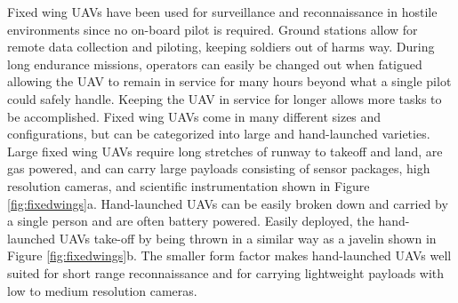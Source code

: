 \documentclass[numbered,pdftex]{ohio-etd}
\begin{document}
Fixed wing UAVs have been used for surveillance and reconnaissance in hostile environments since no on-board pilot is required. Ground stations allow for remote data collection and piloting, keeping soldiers out of harms way. During long endurance missions, operators can easily be changed out when fatigued allowing the UAV to remain in service for many hours beyond what a single pilot could safely handle. Keeping the UAV in service for longer allows more tasks to be accomplished. Fixed wing UAVs come in many different sizes and configurations, but can be categorized into large and hand-launched varieties. Large fixed wing UAVs require long stretches of runway to takeoff and land, are gas powered, and can carry large payloads consisting of sensor packages, high resolution cameras, and scientific instrumentation shown in Figure \ref{fig:fixedwings}a. Hand-launched UAVs can be easily broken down and carried by a single person and are often battery powered. Easily deployed, the hand-launched UAVs take-off by being thrown in a similar way as a javelin shown in Figure \ref{fig:fixedwings}b. The smaller form factor makes hand-launched UAVs well suited for short range reconnaissance and for carrying lightweight payloads with low to medium resolution cameras.

\end{document}
